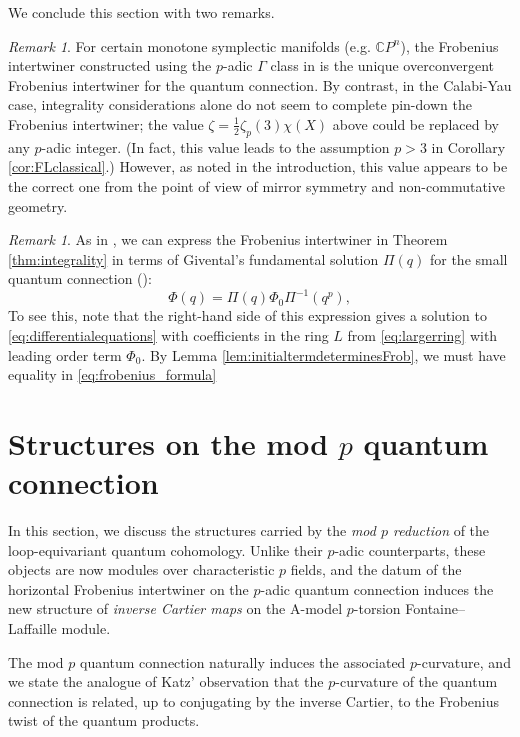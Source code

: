 \documentclass[reqno]{amsart}
\numberwithin{equation}{section}
\numberwithin{equation}{section}
\numberwithin{equation}{section}
\theoremstyle{definition}
\theoremstyle{remark}
\theoremstyle{remark}
\newtheorem{rem}[thm]{Remark}
\begin{document}
We conclude this section with two remarks. 

\begin{rem} For certain monotone symplectic manifolds (e.g. $\mathbb{C}P^n$), the Frobenius intertwiner constructed using the $p$-adic $\Gamma$ class in \cite{bai2025p} is the unique overconvergent Frobenius intertwiner for the quantum connection. By contrast, in the Calabi-Yau case, integrality considerations alone do not seem to complete pin-down the Frobenius intertwiner;  the value  $\zeta = \frac12 \zeta_p(3)\chi(X)$ above could be replaced by any $p$-adic integer. (In fact, this value leads to the assumption $p>3$ in Corollary \ref{cor:FLclassical}.) However, as noted in the introduction, this value appears to be the correct one from the point of view of mirror symmetry and non-commutative geometry.  \end{rem}

\begin{rem} As in \cite[Lemma 3.4]{bai2025p}, we can express the Frobenius intertwiner in  Theorem \ref{thm:integrality} in terms of Givental's fundamental solution $\Pi(q)$ for the small quantum connection (\cite{cox-katz}): 
\begin{equation}\label{eq:frobenius_formula}
\Phi(q) = \Pi(q)\Phi_0\Pi^{-1}(q^p),
\end{equation}
 To see this, note that the right-hand side of this expression gives a solution to \eqref{eq:differentialequations} with coefficients in  the ring $L$ from \eqref{eq:largerring} with leading order term $\Phi_0.$ By Lemma \ref{lem:initialtermdeterminesFrob}, we must have equality in \eqref{eq:frobenius_formula} \end{rem}

\section{Structures on the mod $p$ quantum connection}

In this section, we discuss the structures carried by the \emph{mod $p$ reduction} of the loop-equivariant quantum cohomology. Unlike their $p$-adic counterparts, these objects are now modules over characteristic $p$ fields, and the datum of the horizontal Frobenius intertwiner on the $p$-adic quantum connection induces the new structure of \emph{inverse Cartier maps} on the A-model $p$-torsion Fontaine--Laffaille module.

The mod $p$ quantum connection naturally induces the associated $p$-curvature, and we state the analogue of Katz' observation \cite{Kat70} that the $p$-curvature of the quantum connection is related, up to conjugating by the inverse Cartier, to the Frobenius twist of the quantum products. 
\end{document}
